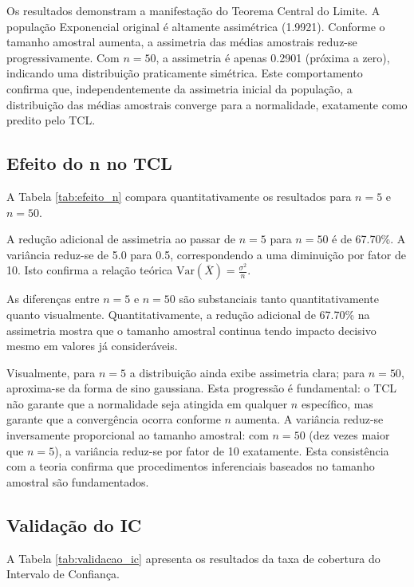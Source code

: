 \documentclass[12pt,a4paper]{article}
\begin{document}
Os resultados demonstram a manifestação do Teorema Central do Limite. A população Exponencial original é altamente assimétrica (1.9921). Conforme o tamanho amostral aumenta, a assimetria das médias amostrais reduz-se progressivamente. Com $n = 50$, a assimetria é apenas 0.2901 (próxima a zero), indicando uma distribuição praticamente simétrica. Este comportamento confirma que, independentemente da assimetria inicial da população, a distribuição das médias amostrais converge para a normalidade, exatamente como predito pelo TCL.

\subsection{Efeito do n no TCL}

A Tabela \ref{tab:efeito_n} compara quantitativamente os resultados para $n = 5$ e $n = 50$.



A redução adicional de assimetria ao passar de $n = 5$ para $n = 50$ é de 67.70\%. A variância reduz-se de 5.0 para 0.5, correspondendo a uma diminuição por fator de 10. Isto confirma a relação teórica $\text{Var}(\overline{X}) = \frac{\sigma^2}{n}$.

As diferenças entre $n = 5$ e $n = 50$ são substanciais tanto quantitativamente quanto visualmente. Quantitativamente, a redução adicional de 67.70\% na assimetria mostra que o tamanho amostral continua tendo impacto decisivo mesmo em valores já consideráveis. 

Visualmente, para $n = 5$ a distribuição ainda exibe assimetria clara; para $n = 50$, aproxima-se da forma de sino gaussiana. Esta progressão é fundamental: o TCL não garante que a normalidade seja atingida em qualquer $n$ específico, mas garante que a convergência ocorra conforme $n$ aumenta. A variância reduz-se inversamente proporcional ao tamanho amostral: com $n = 50$ (dez vezes maior que $n = 5$), a variância reduz-se por fator de 10 exatamente. Esta consistência com a teoria confirma que procedimentos inferenciais baseados no tamanho amostral são fundamentados.

\subsection{Validação do IC}

A Tabela \ref{tab:validacao_ic} apresenta os resultados da taxa de cobertura do Intervalo de Confiança.
\end{document}

